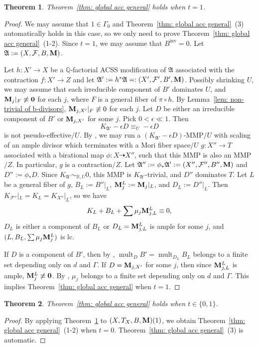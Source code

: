 \documentclass[11pt,reqno]{amsart}
\numberwithin{equation}{section}
\newcommand{\Mm}{{\bf{M}}}
\newcommand{\inv}{\operatorname{inv}}
\newcommand{\mult}{\operatorname{mult}}
\newcommand{\Aa}{{\mathfrak{A}}}
\newcommand{\Ff}{\mathcal{F}}
\newcommand{\Ii}{\Gamma}
\newtheorem{thm}{Theorem}[section]
\theoremstyle{definition}
\begin{document}
\begin{thm}\label{thm: global acc t=1}
    Theorem~\ref{thm: global acc general} holds when $t=1$.
\end{thm}
\begin{proof}
We may assume that $1\in\Ii_0$ and Theorem~\ref{thm: global acc general}~(3) automatically holds in this case, so we only need to prove Theorem~\ref{thm: global acc general}~(1-2). Since $t=1$, we may assume that $B^{\inv}=0$. Let $\Aa:=(X,\Ff,B,\Mm)$.
    
    Let $h\colon X'\rightarrow X$ be a $\mathbb Q$-factorial ACSS modification of $\Aa$ associated with the contraction $f: X'\rightarrow Z$ and let $\Aa':=h^*\Aa=:(X',\Ff',B',\Mm)$. Possibly shrinking $U$, we may assume that each irreducible component of $B'$ dominates $U$, and $\Mm_j|_{F}\not\equiv\bm{0}$ for each $j$, where $F$ is a general fiber of $\pi\circ h$. By Lemma~\ref{lem: non-trivial of b-divisors}, $\Mm_{j,X'}|_{F}\not\equiv 0$ for each $j$. Let $D$ be either an irreducible component of $B'$ or $\Mm_{j,X'}$ for some $j$. Pick $0<\epsilon\ll 1$. Then
$$K_{\Aa'}-\epsilon D\equiv_U-\epsilon D$$
is not pseudo-effective$/U$.
By \cite[Lemma~9.1.4, Theorem~9.3.4]{CHLX23}, we may run a $(K_{\Aa'}-\epsilon D)$-MMP$/U$ with scaling of an ample divisor which terminates with a Mori fiber space$/U$ $g: X''\rightarrow T$ associated with a birational map $\phi\colon X\dashrightarrow X''$, such that this MMP is also an MMP$/Z$. In particular, $g$ is a contraction$/Z$. Let $\Aa'':=\phi_*\Aa':=(X'',\Ff'',B'',\Mm)$ and $D'':=\phi_*D$. Since $K_{\Aa'}\sim_{\mathbb R,U}0$, this MMP is $K_{\Aa'}$-trivial, and $D''$ dominates $T$. Let $L$ be a general fiber of $g$, $B_L:=B''|_L$, $\Mm_j^L:=\Mm_j|_L$, and $D_L:=D''|_L$. Then $K_{\Ff''}|_L=K_L=K_{X''}|_L$, so we have
$$K_L+B_L+\sum\mu_j\Mm_{j,L}^L\equiv 0,$$
$D_L$ is either a component of $B_L$ or $D_L=\Mm_{j,L}^L$ is ample for some $j$, and $(L,B_L,\sum\mu_j\Mm_j^L)$ is lc. 

If $D$ is a component of $B'$, then by \cite[Theorem~1.6]{BZ16}, $\mult_DB'=\mult_{D_L}B_L$ belongs to a finite set depending only on $d$ and $\Ii$. If $D=\Mm_{j,X'}$ for some $j$, then since $\Mm_{j,L}^L$ is ample, $\Mm_j^L\not\equiv\bm{0}$. By \cite[Theorem~1.6]{BZ16}, $\mu_j$ belongs to a finite set depending only on $d$ and $\Ii$. This implies Theorem~\ref{thm: global acc general} when $t=1$.
\end{proof}

\begin{thm}\label{thm: relative global ACC gpair}
      Theorem~\ref{thm: global acc general} holds when $t\in\{0,1\}$.
\end{thm}
\begin{proof}
By applying Theorem~\ref{thm: global acc t=1} to $(X,T_X,B,\Mm)(1)$, we obtain Theorem~\ref{thm: global acc general}~(1-2) when $t=0$. Theorem~\ref{thm: global acc general}~(3) is automatic.
\end{proof}
\end{document}
